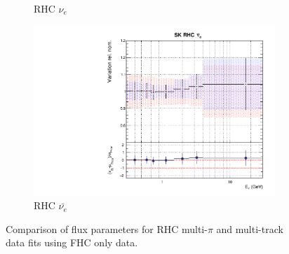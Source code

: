 \begin{figure}[t]
\begin{subfigure}{0.42\textwidth}
  \caption{\SK RHC $\nu_{e}$}
\end{subfigure}
\begin{subfigure}{0.42\textwidth}
  \centering
  \includegraphics[width=0.75\linewidth]{figs/rhcmpdat248flux_15}
  \caption{\SK RHC $\bar{\nu_e}$}
\end{subfigure}
\caption{Comparison of \SK flux parameters for RHC multi-$\pi$ and multi-track data fits using FHC only data.}
\label{fig:rhcmpidat248fluxSK}
\end{figure}

